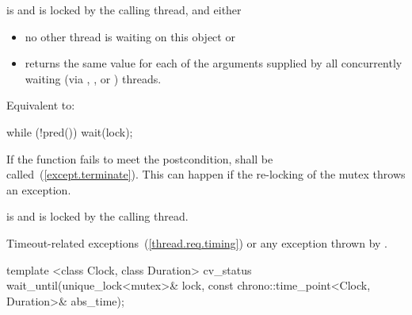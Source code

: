\begin{itemdescr}
\pnum
\requires {} is  and  is
locked by the calling thread, and either

\begin{itemize}
\item no other thread is waiting on this  object or
\item {} returns the same value for each of the 
arguments supplied by all concurrently waiting (via ,
, or ) threads.
\end{itemize}

\pnum
\effects Equivalent to:
\begin{codeblock}
while (!pred())
  wait(lock);
\end{codeblock}

\pnum
\notes
If the function fails to meet the postcondition, 
shall be called~(\ref{except.terminate}).
\enternote This can happen if the re-locking of the mutex throws an exception. \exitnote

\pnum
\postcondition {} is  and 
is locked by the calling thread.

\pnum
\throws Timeout-related
exceptions~(\ref{thread.req.timing}) or any exception thrown by .

\end{itemdescr}

%
%
\begin{itemdecl}
template <class Clock, class Duration>
  cv_status wait_until(unique_lock<mutex>& lock,
                       const chrono::time_point<Clock, Duration>& abs_time);
\end{itemdecl}

